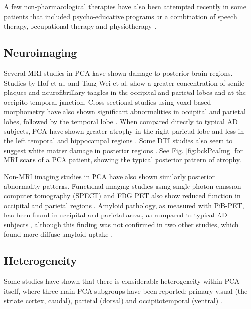 A few non-pharmacological therapies have also been attempted recently in some patients that included psycho-educative programs \cite{videaud2012impact} or a combination of speech therapy, occupational therapy and physiotherapy \cite{weill2012physical}.

\subsection{Neuroimaging}
\label{sec:bckPcaNeu}

Several MRI studies in PCA have shown damage to posterior brain regions. Studies by Hof et al. \cite{hof1997atypical} and Tang-Wei et al. \cite{tang2004clinical} show a greater concentration of senile plaques and neurofibrillary tangles in the occipital and parietal lobes and at the occipito-temporal junction. Cross-sectional studies using voxel-based morphometry have also shown significant abnormalities in occipital and parietal lobes, followed by the temporal lobe \cite{lehmann2011basic,whitwell2007imaging}. When compared directly to typical AD subjects, PCA have shown greater atrophy in the right parietal lobe and less in the left temporal and hippocampal regions \cite{lehmann2011cortical,crutch2012posterior}. Some DTI studies also seem to suggest white matter damage in posterior regions \cite{duning2009pattern,yoshida2004white,migliaccio2012brain}. See Fig. \ref{fig:bckPcaImg} for MRI scans of a PCA patient, showing the typical posterior pattern of atrophy.

Non-MRI imaging studies in PCA have also shown similarly posterior abnormality patterns. Functional imaging studies using single photon emission computer tomography (SPECT) and FDG PET also show reduced function in occipital and parietal regions \cite{kas2011neural, gardini2011visuo, aharon1999posterior, pietrini1996preferential}. Amyloid pathology, as measured with PiB-PET, has been found in occipital and parietal areas, as compared to typical AD subjects \cite{ng2007evaluating, kambe2010posterior, tenovuo2008posterior, formaglio2011vivo}, although this finding was not confirmed in two other studies, which found more diffuse amyloid uptake \cite{rosenbloom2011distinct,de2011similar}.

\subsection{Heterogeneity}
\label{sec:bckPcaHet}

Some studies \cite{ross1996progressive, galton2000atypical} have shown that there is considerable heterogeneity within PCA itself, where three main PCA subgroups have been reported: primary visual (the striate cortex, caudal), parietal (dorsal) and occipitotemporal (ventral) \cite{ross1996progressive, galton2000atypical}. 

